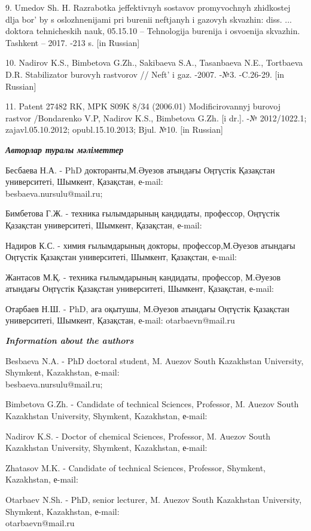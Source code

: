 \begin{references}
9. Umedov Sh. H. Razrabotka jeffektivnyh sostavov promyvochnyh
zhidkostej dlja bor' by s oslozhnenijami pri burenii
neftjanyh i gazovyh skvazhin: diss. ... doktora tehnicheskih nauk,
05.15.10 -- Tehnologija burenija i osvoenija skvazhin. Tashkent -- 2017.
-213 s. {[}in Russian{]}

10. Nadirov K.S., Bimbetova G.Zh., Sakibaeva S.A., Tasanbaeva N.E.,
Tortbaeva D.R. Stabilizator burovyh rastvorov // Neft'{}
i gaz. -2007. -№3. -C.26-29. {[}in Russian{]}

11. Patent 27482 RK, MPK S09K 8/34 (2006.01) Modificirovannyj burovoj
rastvor /Bondarenko V.P, Nadirov K.S., Bimbetova G.Zh. {[}i dr.{]}. -№
2012/1022.1; zajavl.05.10.2012; opubl.15.10.2013; Bjul. №10. {[}in
Russian{]}
\end{references}

\begin{authorinfo}
\emph{{\bfseries Авторлар туралы мәліметтер}}

Бесбаева Н.А. - PhD докторанты,М.Әуезов атындағы Оңтүстік Қазақстан
университеті, Шымкент, Қазақстан, е-mail: \\besbaeva.nursulu@mail.ru;

Бимбетова Г.Ж. - техника ғылымдарының кандидаты, профессор, Оңтүстік
Қазақстан университеті, Шымкент, Қазақстан, е-mail:

Надиров К.С. - химия ғылымдарының докторы, профессор,М.Әуезов атындағы
Оңтүстік Қазақстан университеті, Шымкент, Қазақстан, е-mail:

Жантасов М.Қ. - техника ғылымдарының кандидаты, профессор, М.Әуезов
атындағы Оңтүстік Қазақстан университеті, Шымкент, Қазақстан, е-mail:

Отарбаев Н.Ш. - PhD, аға оқытушы, М.Әуезов атындағы Оңтүстік Қазақстан
университеті, Шымкент, Қазақстан, е-mail: otarbaevn@mail.ru

\emph{{\bfseries Information about the authors}}

Besbaeva N.A. - PhD doctoral student, M. Auezov South Kazakhstan
University, Shymkent, Kazakhstan, е-mail: \\besbaeva.nursulu@mail.ru;

Bimbetova G.Zh. - Candidate of technical Sciences, Professor, M. Auezov
South Kazakhstan University, Shymkent, Kazakhstan, е-mail:

Nadirov K.S. - Doctor of chemical Sciences, Professor, M. Auezov South
Kazakhstan University, Shymkent, Kazakhstan, е-mail:

Zhatasov M.K. - Candidate of technical Sciences, Professor, Shymkent,
Kazakhstan, е-mail:

Otarbaev N.Sh. - PhD, senior lecturer, M. Auezov South
Kazakhstan University, Shymkent, Kazakhstan, е-mail:\\
otarbaevn@mail.ru
\end{authorinfo}
